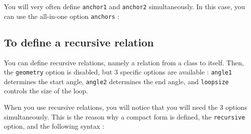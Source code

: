 \documentclass[a4paper,11pt]{report}
\newcommand{\inputTikZ}[1]{%
  }%
\newcommand{\inputTikZ}[1]{%
    \texttt{[image: fig/\#1.pdf]}%
  }%
\begin{document}
\begin{center}
\inputTikZ{tikzanchor}
\end{center}

You will very often define {\tt anchor1} and {\tt anchor2} simultaneously. In this case, you can use the all-in-one option \hypertarget{anchors}{{\tt anchors}} :

\medskip

\begin{minipage}{0.6\textwidth}

\end{minipage}
\begin{minipage}{0.4\textwidth}
\begin{center}
\inputTikZ{relationanchors}
\end{center}
\end{minipage}

\subsection{To define a recursive relation}\label{ss.relrec}

You can define recursive relations, namely a relation from a class to itself. Then, the 
{\tt geometry} option is disabled, but 3 specific options are available : {\tt angle1} determines
the start angle, {\tt angle2} determines the end angle, and {\tt loopsize} controls the size of the loop.

\medskip

\begin{minipage}{0.5\textwidth}

\end{minipage}
\begin{minipage}{0.4\textwidth}
\begin{center}
\inputTikZ{relationrec}
\end{center}
\end{minipage}

\medskip

When you use recursive relations, you will notice that you will need the 3 options simultaneously. This is the reason why a compact form is defined, the {\tt recursive} option, and the following syntax :

\medskip

\begin{minipage}{0.5\textwidth}

\end{minipage}
\begin{minipage}{0.4\textwidth}
\begin{center}
\inputTikZ{relationrec2}
\end{center}
\end{minipage}
\end{document}
